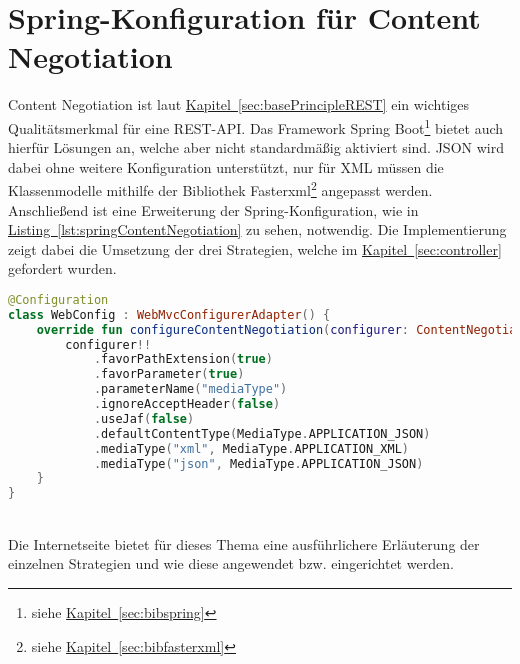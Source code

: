 \section{Spring-Konfiguration für Content Negotiation}\label{sec:contentNegotiation}
Content Negotiation ist laut \hyperref[sec:basePrincipleREST]{Kapitel~\ref{sec:basePrincipleREST}} ein wichtiges Qualitätsmerkmal für eine \gls{REST}-\gls{API}. Das Framework Spring Boot\footnote{siehe \hyperref[sec:bibspring]{Kapitel~\ref{sec:bibspring}}} bietet auch hierfür Lösungen an, welche aber nicht standardmäßig aktiviert sind. \gls{JSON} wird dabei ohne weitere Konfiguration unterstützt, nur für \gls{XML} müssen die Klassenmodelle mithilfe der Bibliothek Fasterxml\footnote{siehe \hyperref[sec:bibfasterxml]{Kapitel~\ref{sec:bibfasterxml}}} angepasst werden. Anschließend ist eine Erweiterung der Spring-Konfiguration, wie in \hyperref[lst:springContentNegotiation]{Listing~\ref{lst:springContentNegotiation}} zu sehen, notwendig. Die Implementierung zeigt dabei die Umsetzung der drei Strategien, welche im \hyperref[sec:controller]{Kapitel~\ref{sec:controller}} gefordert wurden.
\\
\begin{lstlisting}[style=lstStyleFramed, language=Kotlin, caption={Spring-Konfiguration der drei Strategien für Content Negotiation}, label=lst:springContentNegotiation, float]
@Configuration
class WebConfig : WebMvcConfigurerAdapter() {
	override fun configureContentNegotiation(configurer: ContentNegotiationConfigurer?) {
		configurer!!
			.favorPathExtension(true)
			.favorParameter(true)
			.parameterName("mediaType")
			.ignoreAcceptHeader(false)
			.useJaf(false)
			.defaultContentType(MediaType.APPLICATION_JSON)
			.mediaType("xml", MediaType.APPLICATION_XML)
			.mediaType("json", MediaType.APPLICATION_JSON)
	}
}
\end{lstlisting}
\\
Die Internetseite \cite{springContentNegotiation} bietet für dieses Thema eine ausführlichere Erläuterung der einzelnen Strategien und wie diese angewendet bzw. eingerichtet werden.


